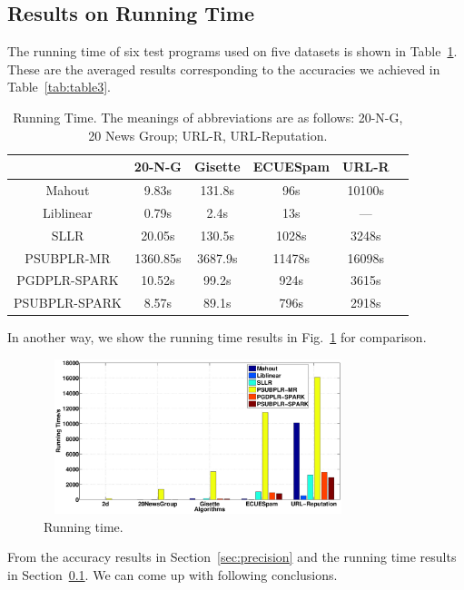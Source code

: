 \documentclass[10pt, conference, compsocconf]{IEEEtran}
\begin{document}
\subsection{Results on Running Time} \label{sec:time}

The running time of six test programs used on five datasets is shown in Table~\ref{tab:table4}.
These are the averaged results corresponding to the accuracies we achieved in Table~\ref{tab:table3}.
%
\begin{table}[h]
\centering
\caption{Running Time. The meanings of abbreviations are as follows: 20-N-G, 20 News Group; URL-R, URL-Reputation.}\label{tab:table4}\vspace{-0.3cm}
\begin{tabular}{|c|c|c|c|c|c|}
\hline
           & 20-N-G & Gisette & ECUESpam & URL-R \\
\hline
Mahout     & 9.83s & 131.8s & 96s & 10100s \\
\hline
Liblinear  & 0.79s & 2.4s & 13s & --- \\
\hline
SLLR       & 20.05s & 130.5s & 1028s & 3248s \\
\hline
PSUBPLR-MR & 1360.85s & 3687.9s & 11478s & 16098s \\
\hline
PGDPLR-SPARK & 10.52s & 99.2s & 924s & 3615s \\
\hline
PSUBPLR-SPARK & 8.57s & 89.1s & 796s & 2918s \\
\hline
\end{tabular}
\end{table}

In another way, we show the running time results in Fig.~\ref{fig:08} for comparison.
\begin{figure}[tb]
\center \includegraphics[height=4.5cm,width=9cm]{img/all_time.eps}\vspace{-0.3cm}
\caption{Running time.}\label{fig:08}\vspace{-0.5cm}
\end{figure}

From the accuracy results in Section~\ref{sec:precision} and the running time results in Section~\ref{sec:time}.
We can come up with following conclusions.
\end{document}
